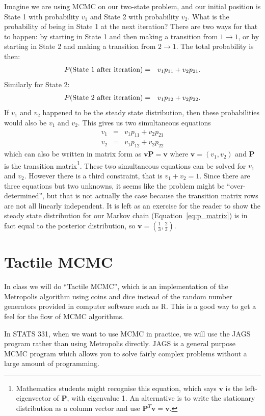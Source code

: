 Imagine we are using MCMC on our two-state problem, and our initial position
is State 1 with probability $v_1$ and State 2 with probability $v_2$. What
is the probability of being in State 1 at the next iteration? There are two
ways for that to happen: by starting in State 1 and then making a transition
from $1\to 1$, or by starting in State 2  and making a transition from $2\to 1$.
The total probability is then:
\begin{eqnarray}
P(\textnormal{State 1 after iteration}) &=& v_1p_{11} + v_2p_{21}.
\end{eqnarray}
Similarly for State 2:
\begin{eqnarray}
P(\textnormal{State 2 after iteration}) &=& v_1p_{12} + v_2p_{22}.
\end{eqnarray}
If $v_1$ and $v_2$ happened to be the steady state distribution, then these
probabilities would also be $v_1$ and $v_2$. This gives us two simultaneous
equations
\begin{eqnarray}
v_1 &=& v_1p_{11} + v_2p_{21}\\
v_2 &=& v_1p_{12} + v_2p_{22}
\end{eqnarray}
which can also be written in matrix form as $\mathbf{v}\mathbf{P} = \mathbf{v}$
where $\mathbf{v} = \left(v_1, v_2\right)$ and $\mathbf{P}$ is the transition
matrix\footnote{Mathematics students might recognise this equation, which says
$\mathbf{v}$ is the left-eigenvector of $\mathbf{P}$, with eigenvalue 1.
An alternative is to write the stationary distribution as a column vector and
use $\mathbf{P}^T\mathbf{v} = \mathbf{v}$.}.
These two simultaneous equations can be solved for $v_1$ and $v_2$.
However there is a third constraint, that is $v_1 + v_2 = 1$. Since there
are three equations but two unknowns, it seems like the problem might be
``over-determined'', but that is not actually the case because the transition
matrix rows are not all linearly independent.
It is left as an exercise for the reader to show the steady state
distribution for our Markov chain (Equation~\ref{eq:p_matrix}) is in fact
equal to the posterior distribution, so
$\mathbf{v} = \left(\frac{1}{3}, \frac{2}{3}\right)$.

\section{Tactile MCMC}
In class we will do ``Tactile MCMC'', which is an implementation of the
Metropolis algorithm using coins and dice instead of the random number generators
provided in computer software such as R. This is a good way to get a feel for
the flow of MCMC algorithms.

In STATS 331, when we want to use MCMC in practice, we will use the JAGS program
rather than using Metropolis directly. JAGS is a general purpose MCMC program
which allows you to solve fairly complex problems without a large amount of
programming.
